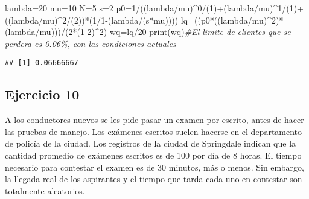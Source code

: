\documentclass[
]{article}
\newenvironment{Shaded}{\begin{snugshade}}{\end{snugshade}}
\newcommand{\CommentTok}[1]{\textcolor[rgb]{0.56,0.35,0.01}{\textit{#1}}}
\newcommand{\DecValTok}[1]{\textcolor[rgb]{0.00,0.00,0.81}{#1}}
\newcommand{\FunctionTok}[1]{\textcolor[rgb]{0.00,0.00,0.00}{#1}}
\newcommand{\NormalTok}[1]{#1}
\newcommand{\OtherTok}[1]{\textcolor[rgb]{0.56,0.35,0.01}{#1}}
\newcommand{\SpecialCharTok}[1]{\textcolor[rgb]{0.00,0.00,0.00}{#1}}
\begin{document}
\begin{Shaded}
\begin{Highlighting}[]
\NormalTok{lambda}\OtherTok{=}\DecValTok{20}
\NormalTok{mu}\OtherTok{=}\DecValTok{10}
\NormalTok{N}\OtherTok{=}\DecValTok{5}
\NormalTok{s}\OtherTok{=}\DecValTok{2}
\NormalTok{p0}\OtherTok{=}\DecValTok{1}\SpecialCharTok{/}\NormalTok{((lambda}\SpecialCharTok{/}\NormalTok{mu)}\SpecialCharTok{\^{}}\DecValTok{0}\SpecialCharTok{/}\NormalTok{(}\DecValTok{1}\NormalTok{)}\SpecialCharTok{+}\NormalTok{(lambda}\SpecialCharTok{/}\NormalTok{mu)}\SpecialCharTok{\^{}}\DecValTok{1}\SpecialCharTok{/}\NormalTok{(}\DecValTok{1}\NormalTok{)}\SpecialCharTok{+}\NormalTok{((lambda}\SpecialCharTok{/}\NormalTok{mu)}\SpecialCharTok{\^{}}\DecValTok{2}\SpecialCharTok{/}\NormalTok{(}\DecValTok{2}\NormalTok{))}\SpecialCharTok{*}\NormalTok{(}\DecValTok{1}\SpecialCharTok{/}\DecValTok{1}\SpecialCharTok{{-}}\NormalTok{(lambda}\SpecialCharTok{/}\NormalTok{(s}\SpecialCharTok{*}\NormalTok{mu))))}
\NormalTok{lq}\OtherTok{=}\NormalTok{((p0}\SpecialCharTok{*}\NormalTok{((lambda}\SpecialCharTok{/}\NormalTok{mu)}\SpecialCharTok{\^{}}\DecValTok{2}\NormalTok{)}\SpecialCharTok{*}\NormalTok{(lambda}\SpecialCharTok{/}\NormalTok{mu)))}\SpecialCharTok{/}\NormalTok{(}\DecValTok{2}\SpecialCharTok{*}\NormalTok{(}\DecValTok{1{-}2}\NormalTok{)}\SpecialCharTok{\^{}}\DecValTok{2}\NormalTok{)}
\NormalTok{wq}\OtherTok{=}\NormalTok{lq}\SpecialCharTok{/}\DecValTok{20}
\FunctionTok{print}\NormalTok{(wq)}\CommentTok{\#El limite de clientes que se perdera es 0.06\%, con las condiciones actuales}
\end{Highlighting}
\end{Shaded}

\begin{verbatim}
## [1] 0.06666667
\end{verbatim}

\hypertarget{ejercicio-10}{%
\subsection{Ejercicio 10}\label{ejercicio-10}}

A los conductores nuevos se les pide pasar un examen por escrito, antes
de hacer las pruebas de manejo. Los exámenes escritos suelen hacerse en
el departamento de policía de la ciudad. Los registros de la ciudad de
Springdale indican que la cantidad promedio de exámenes escritos es de
100 por día de 8 horas. El tiempo necesario para contestar el examen es
de 30 minutos, más o menos. Sin embargo, la llegada real de los
aspirantes y el tiempo que tarda cada uno en contestar son totalmente
aleatorios.
\end{document}
